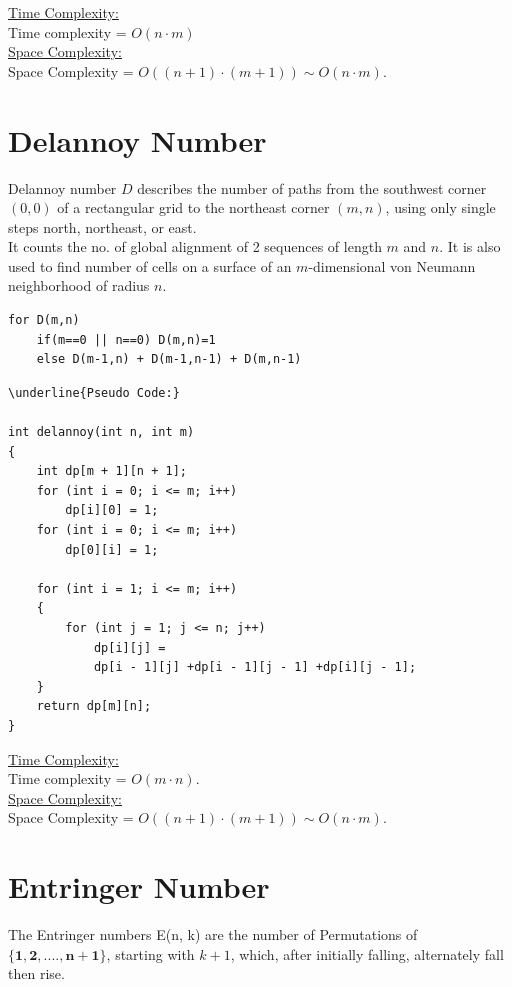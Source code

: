 \documentclass[12pt]{book}
\begin{document}
\underline{Time Complexity:}\\
Time complexity = $O(n \cdot m)$\\

\underline{Space Complexity:}\\
Space Complexity = $O((n+1) \cdot (m+1)) \sim O(n \cdot m)$.\\


\section{Delannoy Number}
Delannoy number $D$ describes the number of paths from the southwest corner $(0, 0)$ of a rectangular grid to the northeast corner $(m, n)$, using only single steps north, northeast, or east.\\
It counts the no. of global alignment of 2 sequences of length $m$ and $n$. It is also used to find number of cells on a surface of an $m$-dimensional von Neumann neighborhood of radius $n$.\\

\begin{lstlisting}
for D(m,n)
	if(m==0 || n==0) D(m,n)=1
	else D(m-1,n) + D(m-1,n-1) + D(m,n-1)
\end{lstlisting}

\begin{lstlisting}
\underline{Pseudo Code:}

int delannoy(int n, int m)
{
    int dp[m + 1][n + 1];
    for (int i = 0; i <= m; i++) 
        dp[i][0] = 1;
    for (int i = 0; i <= m; i++)
        dp[0][i] = 1; 	

    for (int i = 1; i <= m; i++)
    {
        for (int j = 1; j <= n; j++) 
            dp[i][j] = 
            dp[i - 1][j] +dp[i - 1][j - 1] +dp[i][j - 1];
    }
    return dp[m][n];
}

\end{lstlisting}

\underline{Time Complexity:}\\
Time complexity = $O(m \cdot n)$.\\

\underline{Space Complexity:}\\
Space Complexity = $O((n+1) \cdot (m+1)) \sim O(n \cdot m)$.\\


\section{Entringer Number\\}
The Entringer numbers E(n, k) are the number of Permutations of $\mathbf{\{1, 2, ...., n+1\}}$, starting with $k+1$, which, after initially falling, alternately fall then rise.\\
\end{document}
